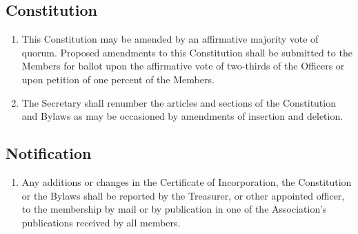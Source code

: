 \subsection{Constitution}
\begin{enumerate}
	\item This Constitution may be amended by an affirmative majority vote of quorum. Proposed amendments to this Constitution shall be submitted to the Members for ballot upon the affirmative vote of two-thirds of the Officers or upon petition of one percent of the Members.
	\item The Secretary shall renumber the articles and sections of the Constitution and Bylaws as may be occasioned by amendments of insertion and deletion.
\end{enumerate}

\subsection{Notification}
\begin{enumerate}
	\item Any additions or changes in the Certificate of Incorporation, the Constitution or the Bylaws shall be reported by the Treasurer, or other appointed officer, to the membership by mail or by publication in one of the Association's publications received by all members.
\end{enumerate}


